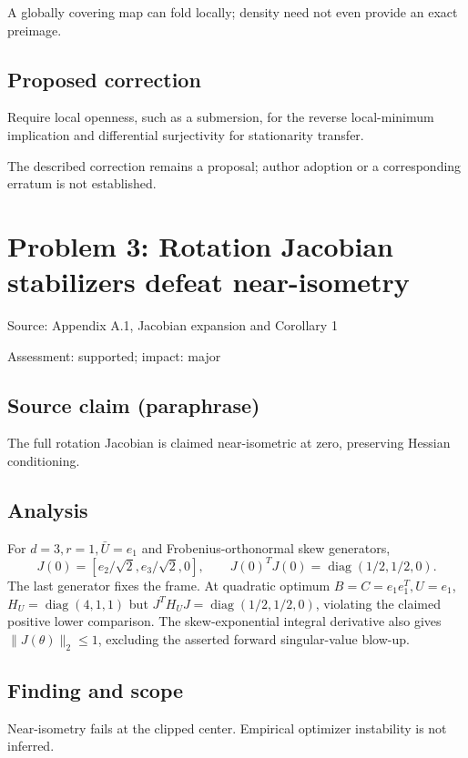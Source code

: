 \documentclass[11pt]{article}
\begin{document}
A globally covering map can fold locally; density need not even provide an exact preimage.

\subsection*{Proposed correction}

Require local openness, such as a submersion, for the reverse local-minimum implication and differential surjectivity for stationarity transfer.

The described correction remains a proposal; author adoption or a corresponding erratum is not established.

\section*{Problem 3: Rotation Jacobian stabilizers defeat near-isometry}

Source: Appendix A.1, Jacobian expansion and Corollary 1

Assessment: supported; impact: major

\subsection*{Source claim (paraphrase)}

The full rotation Jacobian is claimed near-isometric at zero, preserving Hessian conditioning.

\subsection*{Analysis}

For \(d=3,r=1,\bar U=e_1\) and Frobenius-orthonormal skew generators, \[J(0)=[e_2/\sqrt2,e_3/\sqrt2,0],\qquad J(0)^TJ(0)=\operatorname{diag}(1/2,1/2,0).\] The last generator fixes the frame. At quadratic optimum \(B=C=e_1e_1^T,U=e_1\), \(H_U=\operatorname{diag}(4,1,1)\) but \(J^TH_UJ=\operatorname{diag}(1/2,1/2,0)\), violating the claimed positive lower comparison. The skew-exponential integral derivative also gives \(\|J(\theta)\|_2\le1\), excluding the asserted forward singular-value blow-up.

\subsection*{Finding and scope}

Near-isometry fails at the clipped center. Empirical optimizer instability is not inferred.
\end{document}
